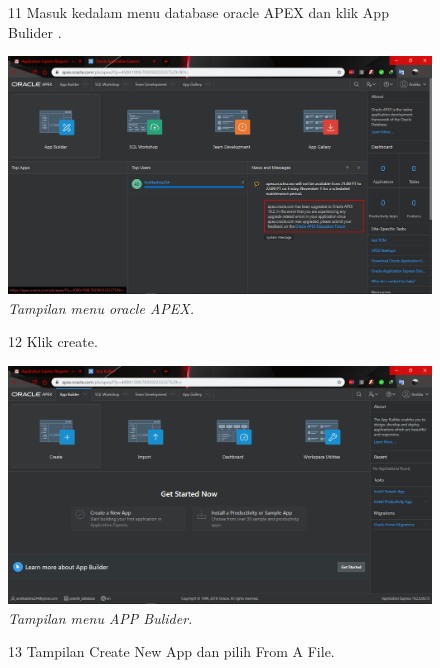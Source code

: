\begin{enumerate}
\begin{figure}
\item[11] Masuk kedalam menu database oracle APEX dan klik App Bulider .

    \begin{center}
\includegraphics[scale=0.2]{figures/1.png}
    \caption{\textit{Tampilan menu oracle APEX.}}
        \end{center}
\label{gambar}
\end{figure}

\begin{figure}
\item[12] Klik create.

    \begin{center}
\includegraphics[scale=0.2]{figures/2.png}
    \caption{\textit{Tampilan menu APP Bulider.}}
        \end{center}
\label{gambar}
\end{figure}

\begin{figure}
\item[13] Tampilan Create New App dan pilih From A File.


\end{figure}
\end{enumerate}
